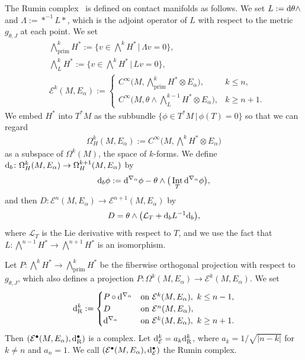 \documentclass[10pt,a4paper]{amsart}
\numberwithin{equation}{section}
\DeclareMathOperator{\Int}{Int}
\DeclareMathOperator{\prim}{prim}
\newcommand{\Rumin}{\mathrm{R}}
\newcommand{\RN}{\cE}
\newcommand{\cE}{\mathcal{E}}
\begin{document}
The Rumin complex~\cite{Rumin-94} is defined on contact manifolds as follows.
We set $L := {\rm d} \theta \wedge $
and $\Lambda := *^{-1} L *$,
which is the adjoint operator of $L$ with respect to the metric $g_{\theta , J}$ at each point.
We set
\begin{align*}
& \textstyle \bigwedge_{\prim}^{k} H^*:=
\big\{
v \in \textstyle \bigwedge^{k} H^*
\, \big| \,
\Lambda v = 0
\big\},
\\
%
%
& \textstyle \bigwedge_{L}^{k} H^*
:=
\big\{
v \in \textstyle \bigwedge^{k} H^*
\, \big| \,
L v = 0
\big\},
\\
& \cE ^k (M , E_{\alpha})
:=
\begin{cases}
 C^\infty \big( M, \bigwedge_{\prim}^{k} H^* \otimes E_{\alpha} \big) , & k \leq n ,\\
 C^\infty \big( M, \theta \wedge\bigwedge_{L}^{k-1} H^* \otimes E_{\alpha} \big) , & k \geq n+1 .
\end{cases}
\end{align*}
We embed $H^*$ into $T^*M$ as the subbundle $ \{ \phi \in T^* M \,|\, \phi (T) = 0 \}$ so that
we can regard
\begin{align*}
\Omega_H^{k} (M, E_{\alpha}) := C^{\infty} \big( M, \textstyle \bigwedge^{k} H^* \otimes E_{\alpha} \big)
\end{align*}
as a subspace of $\Omega^k (M)$, the space of $k$-forms.
We define ${\rm d}_b \colon \Omega_H^{k} (M, E_{\alpha}) \to \Omega_H^{k+1} (M, E_{\alpha})$ by
\[
{\rm d}_b \phi := {\rm d}^{\nabla_{\alpha}} \phi - \theta \wedge \big(\Int_T {\rm d}^{\nabla_{\alpha}} \phi \big)
,
\]
and then $D \colon \cE ^n (M,E_{\alpha}) \to \cE ^{n+1} (M,E_{\alpha}) $ by
\[
D = \theta \wedge \big( \mathcal{L}_T + {\rm d}_b L^{-1} {\rm d}_b \big),
\]
where $\mathcal{L}_T$ is the Lie derivative with respect to $T$,
and we use the fact that $L \colon \textstyle \bigwedge^{n-1} H^* \to\textstyle \bigwedge^{n+1} H^*$ is an isomorphism.

Let $P \colon \textstyle \bigwedge^{k} H^* \to \textstyle \bigwedge_{\prim}^{k} H^* $ be the fiberwise orthogonal projection with respect to $g_{\theta , J}$, which also defines a projection $P \colon \Omega^k (M,E_{\alpha}) \to \cE ^k (M,E_{\alpha}) $.
We set
\[
{\rm d}_{\Rumin }^k
:=
\begin{cases}
P \circ {\rm d}^{\nabla_{\alpha}} & \text{on } \cE ^k (M,E_{\alpha}), \ k \leq n-1, \\
D & \text{on } \cE ^n (M,E_{\alpha}) , \\
{\rm d}^{\nabla_{\alpha}} & \text{on } \cE ^k (M,E_{\alpha}) , \ k \geq n+1.
\end{cases}
\]
Then $(\cE ^\bullet (M,E_{\alpha}), {\rm d}_{\Rumin }^\bullet)$ is a complex.
Let ${\rm d}_\RN ^{k} = a_k {\rm d}_{\Rumin }^{k}$, where
$a_k = 1 / \sqrt{|n-k|}$ for $k \not = n$ and
$a_n = 1$.
We call $(\cE ^\bullet (M,E_{\alpha}), {\rm d}_\RN ^\bullet)$ the Rumin complex.
\end{document}
